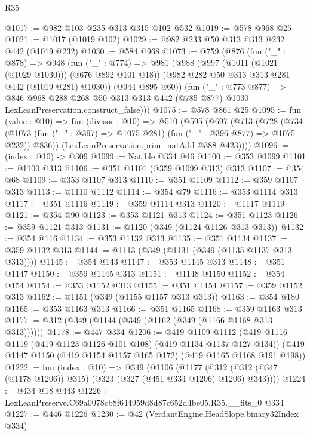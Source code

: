 \begin{lexlean}{R35}
\begin{coremodule}
@1017 := @982 @103 @235 @313 @315 @102 @532
@1019 := @578 @968 @25
@1021 := @1017 (@1019 @102)
@1029 := @982 @233 @50 @313 @313 @232 @442 (@1019 @232)
@1030 := @584 @968
@1073 := @759
    (@876
      (fun ("_" : @878) =>
      @948
        (fun ("_" : @774) =>
        @981
          (@988
            (@997 (@1011 (@1021 (@1029 @1030))) (@676 @892 @101 @18))
            (@982 @282 @50 @313 @313 @281 @442 (@1019 @281) @1030))
          (@944 @895 @60))
        (fun ("_" : @773 @877) =>
        @846
          @968
          @288
          @268
          @50
          @313
          @313
          @442
          (@785 @877)
          @1030
          LexLeanPreservation.construct_false)))
@1075 := @578 @861 @25
@1095 := fun (value : @10) =>
  fun (divisor : @10) =>
  @510
    (@595
      (@697
        (@713
          (@728
            (@734
              (@1073 (fun ("_" : @397) => @1075 @281) (fun ("_" : @396 @877) => @1075 @232))
              @836))
          (LexLeanPreservation.prim_natAdd @388 @423))))
@1096 := (index : @10) -> @309
@1099 := Nat.ble @334 @46
@1100 := @353 @1099
@1101 := @1100 @313
@1106 := @351 @1101 (@359 @1099 @313) @313
@1107 := @354 @68
@1109 := @353 @1107 @313
@1110 := @351 @1109
@1112 := @359 @1107 @313
@1113 := @1110 @1112
@1114 := @354 @79
@1116 := @353 @1114 @313
@1117 := @351 @1116
@1119 := @359 @1114 @313
@1120 := @1117 @1119
@1121 := @354 @90
@1123 := @353 @1121 @313
@1124 := @351 @1123
@1126 := @359 @1121 @313
@1131 := @1120 (@349 (@1124 @1126 @313 @313))
@1132 := @354 @116
@1134 := @353 @1132 @313
@1135 := @351 @1134
@1137 := @359 @1132 @313
@1144 := @1113 (@349 (@1131 (@349 (@1135 @1137 @313 @313))))
@1145 := @354 @143
@1147 := @353 @1145 @313
@1148 := @351 @1147
@1150 := @359 @1145 @313
@1151 := @1148 @1150
@1152 := @354 @154
@1154 := @353 @1152 @313
@1155 := @351 @1154
@1157 := @359 @1152 @313
@1162 := @1151 (@349 (@1155 @1157 @313 @313))
@1163 := @354 @180
@1165 := @353 @1163 @313
@1166 := @351 @1165
@1168 := @359 @1163 @313
@1177 := @312 (@349 (@1144 (@349 (@1162 (@349 (@1166 @1168 @313 @313))))))
@1178 := @447 @334
@1206 := @419
    @1109
    @1112
    (@419 @1116 @1119 (@419 @1123 @1126 @101 @108) (@419 @1134 @1137 @127 @134))
    (@419 @1147 @1150 (@419 @1154 @1157 @165 @172) (@419 @1165 @1168 @191 @198))
@1222 := fun (index : @10) =>
  @349
    (@1106
      (@1177 (@312 (@312 (@347 (@1178 @1206)) @315) (@323 (@327 (@451 @334 @1206) @1206) @343))))
@1224 := @434 @18 @443
@1226 := LexLeanPreserve.C69a0078cb8f644959d8d87c652d4be05.R35.__fits_0 @334
@1227 := @446 @1226
@1230 := @42 (VerdantEngine.HeadSlope.binary32Index @334)

\end{coremodule}
\end{lexlean}
